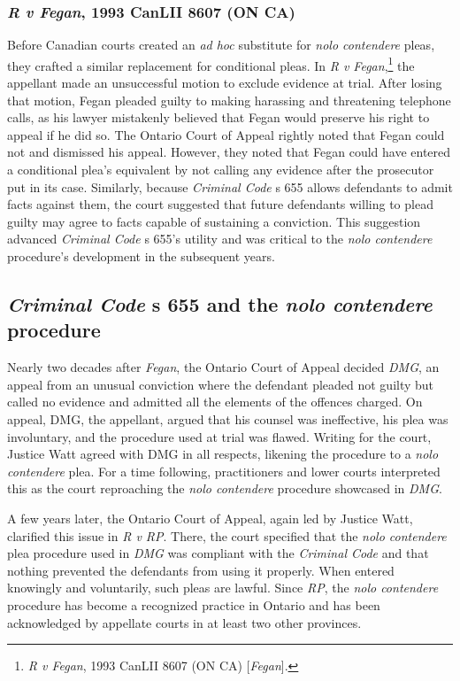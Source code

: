 \subsubsection{\textit{R v Fegan}, 1993 CanLII 8607 (ON CA)}

Before Canadian courts created an \textit{ad hoc} substitute for \textit{nolo contendere} pleas, they crafted a similar replacement for conditional pleas. In \textit{R v Fegan},\footnote{\textit{R v Fegan}, 1993 CanLII 8607 (ON CA) [\textit{Fegan}].} the appellant made an unsuccessful motion to exclude evidence at trial. After losing that motion, Fegan pleaded guilty to making harassing and threatening telephone calls, as his lawyer mistakenly believed that Fegan would preserve his right to appeal if he did so. The Ontario Court of Appeal rightly noted that Fegan could not and dismissed his appeal. However, they noted that Fegan could have entered a conditional plea's equivalent by not calling any evidence after the prosecutor put in its case. Similarly, because \textit{Criminal Code} s 655 allows defendants to admit facts against them, the court suggested that future defendants willing to plead guilty may agree to facts capable of sustaining a conviction. This suggestion advanced \textit{Criminal Code} s 655's utility and was critical to the \textit{nolo contendere} procedure's development in the subsequent years.

\subsection{\textit{Criminal Code} s 655 and the \textit{nolo contendere} procedure}

Nearly two decades after \textit{Fegan}, the Ontario Court of Appeal decided \textit{DMG}, an appeal from an unusual conviction where the defendant pleaded not guilty but called no evidence and admitted all the elements of the offences charged. On appeal, DMG, the appellant, argued that his counsel was ineffective, his plea was involuntary, and the procedure used at trial was flawed. Writing for the court, Justice Watt agreed with DMG in all respects, likening the procedure to a \textit{nolo contendere} plea. For a time following, practitioners and lower courts interpreted this as the court reproaching the \textit{nolo contendere} procedure showcased in \textit{DMG}.

A few years later, the Ontario Court of Appeal, again led by Justice Watt, clarified this issue in \textit{R v RP}. There, the court specified that the \textit{nolo contendere} plea procedure used in \textit{DMG} was compliant with the \textit{Criminal Code} and that nothing prevented the defendants from using it properly. When entered knowingly and voluntarily, such pleas are lawful. Since \textit{RP}, the \textit{nolo contendere} procedure has become a recognized practice in Ontario and has been acknowledged by appellate courts in at least two other provinces.


